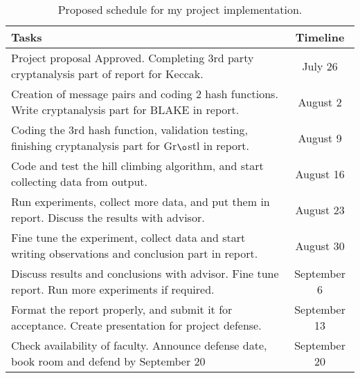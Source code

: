 \begin{table}[h]
  \begin{center}
    \begin{tabular}{ | p{11.5cm} | c | } \hline
      Tasks                                                                                                   & Timeline \\ \hline
      Project proposal Approved. Completing 3rd party cryptanalysis part of report for Keccak.                & July 26 \\ \hline
      Creation of message pairs and coding 2 hash functions. Write cryptanalysis part for BLAKE in report.    & August 2 \\ \hline
      Coding the 3rd hash function, validation testing, finishing cryptanalysis part for Gr$\o$stl in report. & August 9 \\ \hline
      Code and test the hill climbing algorithm, and start collecting data from output.                       & August 16 \\ \hline
      Run experiments, collect more data, and put them in report. Discuss the results with advisor.           & August 23 \\ \hline
      Fine tune the experiment, collect data and start writing observations and conclusion part in report.    & August 30 \\ \hline
      Discuss results and conclusions with advisor. Fine tune report. Run more experiments if required.       & September 6 \\ \hline
      Format the report properly, and submit it for acceptance. Create presentation for project defense.      & September 13 \\ \hline
      Check availability of faculty. Announce defense date, book room and defend by September 20              & September 20 \\ \hline
    \end{tabular}
  \caption{Proposed schedule for my project implementation.}
  \end{center}
\end{table}

